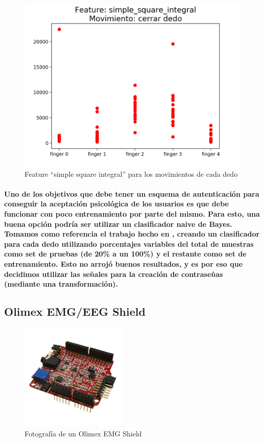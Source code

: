 \documentclass{article}
\begin{document}
\begin{figure}[ht]
    \centering
    \includegraphics[width=\textwidth]{Figure_3.png}%
    \caption{Feature “simple square integral” para los movimientos de cada dedo}
    \label{fig:feature3}
\end{figure}

\paragraph{
Uno de los objetivos que debe tener un esquema de autenticación para conseguir la aceptación psicológica de los usuarios es que debe funcionar con poco entrenamiento por parte del mismo. Para esto, una buena opción podría ser utilizar un clasificador naive de Bayes. Tomamos como referencia el trabajo hecho en \cite{yousefi2015}, creando un clasificador para cada dedo utilizando porcentajes variables del total de muestras como set de pruebas (de 20\% a un 100\%) y el restante como set de entrenamiento. Esto no arrojó buenos resultados, y es por eso que decidimos utilizar las señales para la creación de contraseñas (mediante una transformación).
}

\subsection{Olimex EMG/EEG Shield}

\begin{figure}[ht]
    \centering
    \includegraphics[width=2in]{SHIELD-EKG-EMG.jpg}%
    \caption{Fotografía de un Olimex EMG Shield}
    \label{fig:olimexshield}
\end{figure}
\end{document}
